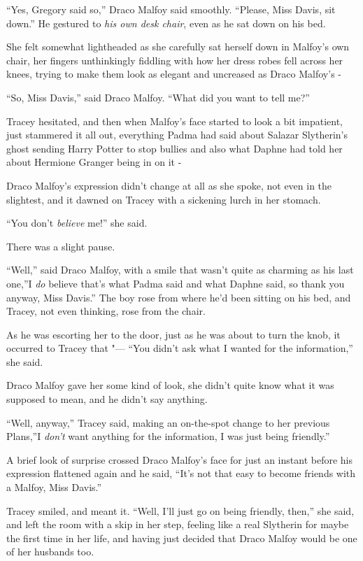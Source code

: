 ``Yes, Gregory said so,'' Draco Malfoy said smoothly. ``Please, Miss
Davis, sit down.'' He gestured to \emph{his own desk chair}, even as he
sat down on his bed.

She felt somewhat lightheaded as she carefully sat herself down in
Malfoy's own chair, her fingers unthinkingly fiddling with how her dress
robes fell across her knees, trying to make them look as elegant and
uncreased as Draco Malfoy's -

``So, Miss Davis,'' said Draco Malfoy. ``What did you want to tell me?''

Tracey hesitated, and then when Malfoy's face started to look a bit
impatient, just stammered it all out, everything Padma had said about
Salazar Slytherin's ghost sending Harry Potter to stop bullies and also
what Daphne had told her about Hermione Granger being in on it -

Draco Malfoy's expression didn't change at all as she spoke, not even in
the slightest, and it dawned on Tracey with a sickening lurch in her
stomach.

``You don't \emph{believe} me!'' she said.

There was a slight pause.

``Well,'' said Draco Malfoy, with a smile that wasn't quite as charming
as his last one,''I \emph{do} believe that's what Padma said and what
Daphne said, so thank you anyway, Miss Davis.'' The boy rose from where
he'd been sitting on his bed, and Tracey, not even thinking, rose from
the chair.

As he was escorting her to the door, just as he was about to turn the
knob, it occurred to Tracey that "--- ``You didn't ask what I wanted for
the information,'' she said.

Draco Malfoy gave her some kind of look, she didn't quite know what it
was supposed to mean, and he didn't say anything.

``Well, anyway,'' Tracey said, making an on-the-spot change to her
previous Plans,''I \emph{don't} want anything for the information, I was
just being friendly.''

A brief look of surprise crossed Draco Malfoy's face for just an instant
before his expression flattened again and he said, ``It's not that easy
to become friends with a Malfoy, Miss Davis.''

Tracey smiled, and meant it. ``Well, I'll just go on being friendly,
then,'' she said, and left the room with a skip in her step, feeling
like a real Slytherin for maybe the first time in her life, and having
just decided that Draco Malfoy would be one of her husbands too.

